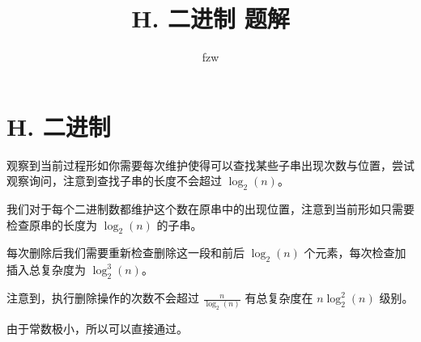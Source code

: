 \documentclass{article}
\title{H. 二进制 题解}                   %
\author{fzw}
\begin{document}
   \maketitle                                  %
\tableofcontents                               %

\newpage

\section{H. 二进制}                             %

观察到当前过程形如你需要每次维护使得可以查找某些子串出现次数与位置，尝试观察询问，注意到查找子串的长度不会超过 $\log_2 (n)$。

我们对于每个二进制数都维护这个数在原串中的出现位置，注意到当前形如只需要检查原串的长度为 $\log_2(n)$ 的子串。

每次删除后我们需要重新检查删除这一段和前后 $\log_2(n)$ 个元素，每次检查加插入总复杂度为 $\log_2^3(n)$。

注意到，执行删除操作的次数不会超过 $\frac n{\log_2(n)}$ 有总复杂度在 $n\log_2^2(n)$ 级别。

由于常数极小，所以可以直接通过。
\end{document}
